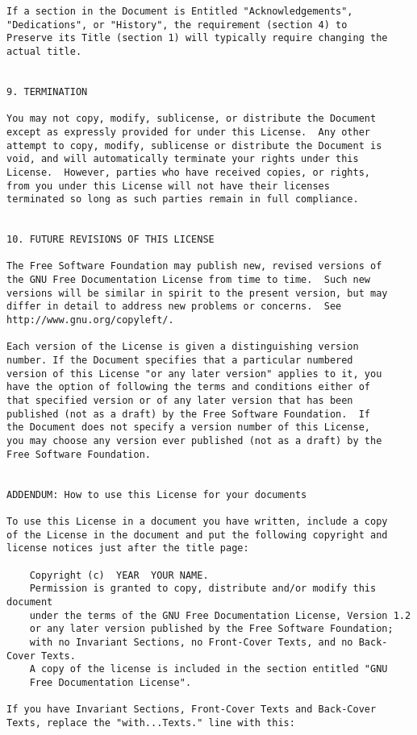 \begin{verbatim}
If a section in the Document is Entitled "Acknowledgements",
"Dedications", or "History", the requirement (section 4) to
Preserve its Title (section 1) will typically require changing the
actual title.


9. TERMINATION

You may not copy, modify, sublicense, or distribute the Document
except as expressly provided for under this License.  Any other
attempt to copy, modify, sublicense or distribute the Document is
void, and will automatically terminate your rights under this
License.  However, parties who have received copies, or rights,
from you under this License will not have their licenses
terminated so long as such parties remain in full compliance.


10. FUTURE REVISIONS OF THIS LICENSE

The Free Software Foundation may publish new, revised versions of
the GNU Free Documentation License from time to time.  Such new
versions will be similar in spirit to the present version, but may
differ in detail to address new problems or concerns.  See
http://www.gnu.org/copyleft/.

Each version of the License is given a distinguishing version
number. If the Document specifies that a particular numbered
version of this License "or any later version" applies to it, you
have the option of following the terms and conditions either of
that specified version or of any later version that has been
published (not as a draft) by the Free Software Foundation.  If
the Document does not specify a version number of this License,
you may choose any version ever published (not as a draft) by the
Free Software Foundation.


ADDENDUM: How to use this License for your documents

To use this License in a document you have written, include a copy
of the License in the document and put the following copyright and
license notices just after the title page:

    Copyright (c)  YEAR  YOUR NAME.
    Permission is granted to copy, distribute and/or modify this document
    under the terms of the GNU Free Documentation License, Version 1.2
    or any later version published by the Free Software Foundation;
    with no Invariant Sections, no Front-Cover Texts, and no Back-Cover Texts.
    A copy of the license is included in the section entitled "GNU
    Free Documentation License".

If you have Invariant Sections, Front-Cover Texts and Back-Cover
Texts, replace the "with...Texts." line with this:


\end{verbatim}
